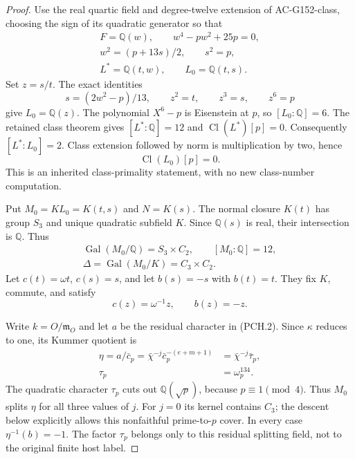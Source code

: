 \begin{proof}
Use the real quartic field and degree-twelve extension of
AC-G152-class, choosing the sign of its quadratic generator so that
\[
 \begin{gathered}
 F=\mathbb Q(w),\qquad w^4-pw^2+25p=0,\\
 w^2=(p+13s)/2,\qquad s^2=p,\\
 L^*=\mathbb Q(t,w),\qquad L_0=\mathbb Q(t,s).
 \end{gathered}
 \tag{PCH.3}
\]
Set $z=s/t$.  The exact identities
\[
       s=(2w^2-p)/13,\qquad z^2=t,\qquad z^3=s,
       \qquad z^6=p
 \tag{PCH.4}
\]
give $L_0=\mathbb Q(z)$.
The polynomial $X^6-p$ is Eisenstein at $p$, so $[L_0:\mathbb Q]=6$.
The retained class theorem gives
$[L^*:\mathbb Q]=12$ and $\operatorname{Cl}(L^*)[p]=0$.
Consequently $[L^*:L_0]=2$.
Class extension followed by norm is multiplication by two, hence
\[
                         \operatorname{Cl}(L_0)[p]=0.
 \tag{PCH.5}
\]
This is an inherited class-primality statement, with no new
class-number computation.

Put $M_0=KL_0=K(t,s)$ and $N=K(s)$.
The normal closure $K(t)$ has group $S_3$ and unique quadratic
subfield $K$.  Since $\mathbb Q(s)$ is real, their intersection
is $\mathbb Q$.  Thus
\[
 \begin{gathered}
 \operatorname{Gal}(M_0/\mathbb Q)=S_3\times C_2,
 \qquad [M_0:\mathbb Q]=12,\\
 \Delta=\operatorname{Gal}(M_0/K)=C_3\times C_2.
 \end{gathered}
 \tag{PCH.6}
\]
Let $c(t)=\omega t$, $c(s)=s$, and let $b(s)=-s$ with $b(t)=t$.
They fix $K$, commute, and satisfy
\[
                         c(z)=\omega^{-1}z,\qquad b(z)=-z.
 \tag{PCH.7}
\]

Write $k=O/\mathfrak m_O$ and let $a$ be the residual character
in (PCH.2).  Since $\kappa$ reduces to one, its Kummer quotient is
\[
 \begin{aligned}
 \eta=a/\bar c_p
     =\bar\chi^{-j}\bar c_p^{-(e+m+1)}
     &=\bar\chi^{-j}\bar\tau_p,\\
 \tau_p&=\omega_p^{134}.
 \end{aligned}
 \tag{PCH.8}
\]
The quadratic character $\tau_p$ cuts out $\mathbb Q(\sqrt p)$,
because $p\equiv1\pmod4$.
Thus $M_0$ splits $\eta$ for all three values of $j$.
For $j=0$ its kernel contains $C_3$; the descent below explicitly
allows this nonfaithful prime-to-$p$ cover.
In every case $\eta^{-1}(b)=-1$.
The factor $\tau_p$ belongs only to this residual splitting field,
not to the original finite host label.


\end{proof}

